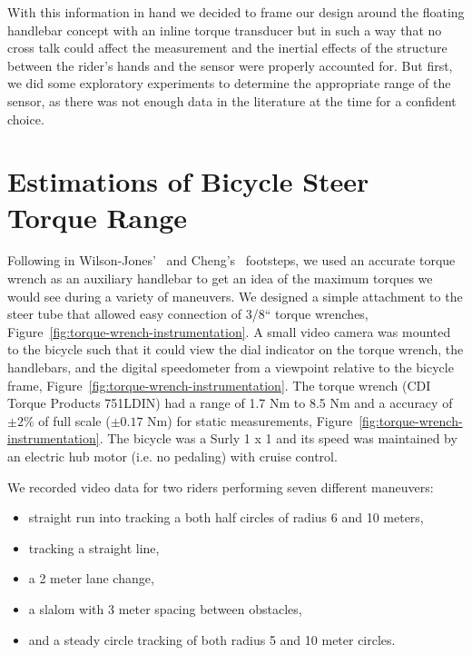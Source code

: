 \documentclass[10pt]{article}
\begin{document}

With this information in hand we decided to frame our design around the
floating handlebar concept with an inline torque transducer but in such a way
that no cross talk could affect the measurement and the inertial effects of the
structure between the rider's hands and the sensor were properly accounted for.
But first, we did some exploratory experiments to determine the appropriate
range of the sensor, as there was not enough data in the literature at the time
for a confident choice.

\section*{Estimations of Bicycle Steer Torque Range}

Following in Wilson-Jones'~\cite{Wilson-Jones1951} and Cheng’s~\cite{Cheng2003}
footsteps, we used an accurate torque wrench as an auxiliary handlebar to get
an idea of the maximum torques we would see during a variety of maneuvers. We
designed a simple attachment to the steer tube that allowed easy connection of
3/8`` torque wrenches, Figure~\ref{fig:torque-wrench-instrumentation}. A small
video camera was mounted to the bicycle such that it could view the dial
indicator on the torque wrench, the handlebars, and the digital speedometer
from a viewpoint relative to the bicycle frame,
Figure~\ref{fig:torque-wrench-instrumentation}.  The torque wrench (CDI Torque
Products 751LDIN) had a range of 1.7 Nm to 8.5 Nm and a accuracy of $\pm2$\% of
full scale ($\pm0.17$ Nm) for static measurements,
Figure~\ref{fig:torque-wrench-instrumentation}. The bicycle was a Surly 1 x 1
and its speed was maintained by an electric hub motor (i.e. no pedaling) with
cruise control.

We recorded video data for two riders performing seven different maneuvers:

\begin{itemize}
  \item straight run into tracking a both half circles of radius 6 and 10
    meters,
  \item tracking a straight line,
  \item a 2 meter lane change,
  \item a slalom with 3 meter spacing between obstacles,
  \item and a steady circle tracking of both radius 5 and 10 meter circles.
\end{itemize}
\end{document}
